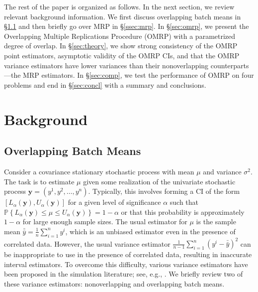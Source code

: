 \documentclass[12pt]{article}
\newcommand{\p}[1]{\mathbb{P} \left\{ #1 \right\}}
\newcommand{\y}{\mathbf{y}}
\newcommand{\yb}{\bar{y}}
\newcommand{\ybb}{\bar{\yb}}
\begin{document}
The rest of the paper is organized as follows.  
In the next section, we review relevant background information.  
We first discuss overlapping batch means in \S \ref{ssec:obm} and then briefly go over MRP in \S \ref{ssec:mrp}.  
In \S \ref{sec:omrp}, we present the Overlapping Multiple Replications Procedure (OMRP) with a parametrized degree of overlap.  
In \S \ref{sec:theory}, we show strong consistency of the OMRP point estimators, asymptotic validity of the OMRP CIs, and that the OMRP variance estimators have lower variances than their nonoverlapping counterparts---the MRP estimators.
In \S \ref{sec:comp}, we test the performance of OMRP on four problems and end in \S \ref{sec:concl} with a summary and conclusions.

\section{Background}
\label{sec:background}

\subsection{Overlapping Batch Means} \label{ssec:obm}
Consider a covariance stationary stochastic process with mean $\mu$ and variance $\sigma^2$.  
The task is to estimate $\mu$ given some realization of the univariate stochastic process $\y = (y^1, y^2, \dots, y^n)$.  
Typically, this involves forming a CI of the form $[L_\alpha(\y), U_\alpha(\y)]$ for a given level of significance $\alpha$ such that $\p{L_\alpha(\y) \leq \mu \leq U_\alpha(\y)} = 1 - \alpha$ or that this probability is approximately $1 - \alpha$ for large enough sample sizes.  
The usual estimator for $\mu$ is the sample mean $\ybb = \frac{1}{n} \sum_{i=1}^n y^i$, which is an unbiased estimator even in the presence of correlated data.  
However, the usual variance estimator $\frac{1}{n-1} \sum_{i=1}^n (y^i - \ybb)^2$ can be inappropriate to use in the presence of correlated data, resulting in inaccurate interval estimators.  
To overcome this difficulty, various variance estimators have been proposed in the simulation literature; see, e.g., \citep{law_07}.  
We briefly review two of these variance estimators: nonoverlapping and overlapping batch means.
\end{document}
